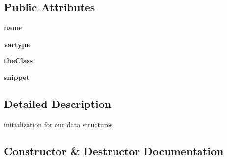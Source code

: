 \subsection*{Public Attributes}
\begin{DoxyCompactItemize}
\item 
{\bfseries name}\hypertarget{class_parsing_classes_actual_1_1_data_structure_declaration_ac8db5fc9818883f97ab6d2fd2671be03}{}\label{class_parsing_classes_actual_1_1_data_structure_declaration_ac8db5fc9818883f97ab6d2fd2671be03}

\item 
{\bfseries vartype}\hypertarget{class_parsing_classes_actual_1_1_data_structure_declaration_ae97cc741ab55e0998ef6b70dec8e5576}{}\label{class_parsing_classes_actual_1_1_data_structure_declaration_ae97cc741ab55e0998ef6b70dec8e5576}

\item 
{\bfseries the\+Class}\hypertarget{class_parsing_classes_actual_1_1_data_structure_declaration_a1955dd224837df313ca02bc67d22327d}{}\label{class_parsing_classes_actual_1_1_data_structure_declaration_a1955dd224837df313ca02bc67d22327d}

\item 
{\bfseries snippet}\hypertarget{class_parsing_classes_actual_1_1_data_structure_declaration_aef73b24e2d4216905f4cffca0ce6f002}{}\label{class_parsing_classes_actual_1_1_data_structure_declaration_aef73b24e2d4216905f4cffca0ce6f002}

\end{DoxyCompactItemize}


\subsection{Detailed Description}
initialization for our data structures 

\subsection{Constructor \& Destructor Documentation}
